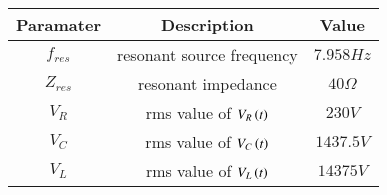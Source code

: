 \begin{tabular}{|c|c|c|}
\hline
\textbf{Paramater} & \textbf{Description} & \textbf{Value}  \\ \hline
$f_{res}$ & resonant source frequency & $7.958 Hz$\\\hline
$Z_{res}$ & resonant impedance & $40 \Omega$\\\hline
$V_{R}$ & rms value of $V_R \left(t\right)$ & $230 V$\\\hline
$V_{C}$ & rms value of $V_C \left(t\right)$ & $1437.5 V$\\\hline
$V_{L}$ & rms value of $V_L \left(t\right)$ & $14375 V$\\\hline
\end{tabular}
